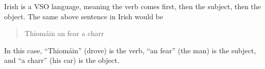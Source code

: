 Irish is a VSO language, meaning the verb comes first, then the subject, then the object. The same above sentence in Irish would be
\begin{quote}
    Thiomáin an fear a charr
\end{quote}
In this case, ``Thiomáin'' (drove) is the verb, ``an fear'' (the man) is the subject, and ``a charr'' (his car) is the object.

